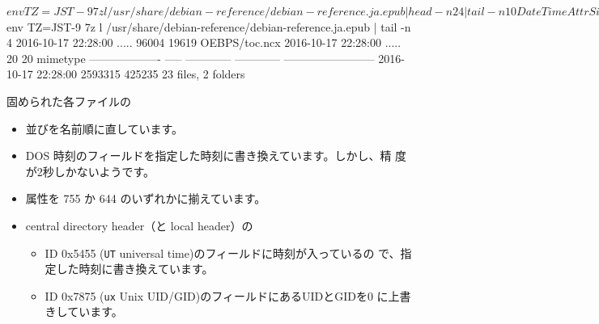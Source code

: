 \documentclass[mingoth,a4paper]{jsarticle}
\begin{document}
\begin{commandline}
$ env TZ=JST-9 7z l /usr/share/debian-reference/debian-reference.ja.epub | head -n 24 | tail -n 10
   Date      Time    Attr         Size   Compressed  Name
------------------- ----- ------------ ------------  ------------------------
2016-10-17 22:28:00 D....            0            0  META-INF
2016-10-17 22:28:00 .....          255          175  META-INF/container.xml
2016-10-17 22:28:00 D....            0            0  OEBPS
2016-10-17 22:28:00 .....        10451         3596  OEBPS/apa.html
2016-10-17 22:28:00 .....       123568        16458  OEBPS/bk01-toc.html
2016-10-17 22:28:00 .....       279742        45365  OEBPS/ch01.html
2016-10-17 22:28:00 .....       306201        49878  OEBPS/ch02.html
2016-10-17 22:28:00 .....        86922        15031  OEBPS/ch03.html
$ env TZ=JST-9 7z l /usr/share/debian-reference/debian-reference.ja.epub | tail -n 4
2016-10-17 22:28:00 .....        96004        19619  OEBPS/toc.ncx
2016-10-17 22:28:00 .....           20           20  mimetype
------------------- ----- ------------ ------------  ------------------------
2016-10-17 22:28:00            2593315       425235  23 files, 2 folders
\end{commandline}

固められた各ファイルの
\begin{itemize}
 \item 並びを名前順に直しています。
 \item DOS 時刻のフィールドを指定した時刻に書き換えています。しかし、精
       度が2秒しかないようです。
 \item 属性を 755 か 644 のいずれかに揃えています。
 \item central directory header（と local header）の
       \begin{itemize}
	\item ID 0x5455 (\verb|UT| universal time)のフィールドに時刻が入っているの
	      で、指定した時刻に書き換えています。
	\item ID 0x7875 (\verb|ux| Unix UID/GID)のフィールドにあるUIDとGIDを0
	      に上書きしています。
       \end{itemize}
\end{itemize}
\end{document}
